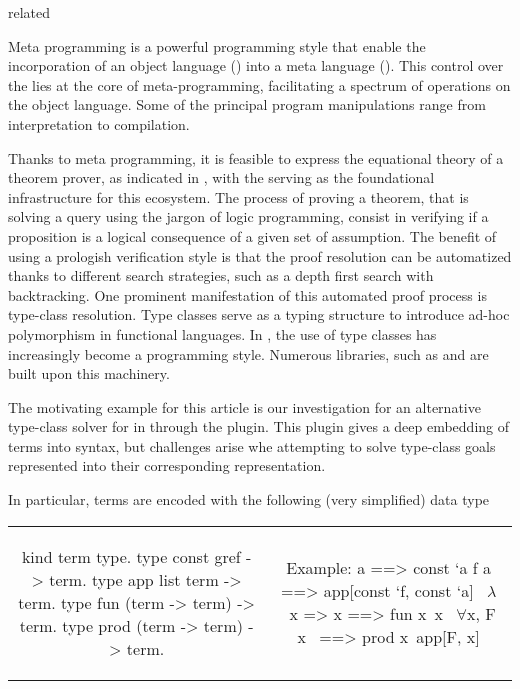 \documentclass{rapport}
\begin{document}
related~\cite{felty93lics}

Meta programming is a powerful programming style that enable the incorporation
of an object language (\ol) into a meta language (\ml). This control over the
\ol lies at the core of meta-programming, facilitating a spectrum of operations
on the object language. Some of the principal program manipulations range
from interpretation to compilation.

Thanks to meta programming, it is feasible to express the equational theory of a
theorem prover, as indicated in \cite{X, Y, Z}, with the \ml serving as the
foundational infrastructure for this ecosystem. The process of proving a theorem, that is
solving a query using the jargon of logic programming, consist in verifying if a
proposition is a logical consequence of a given set of assumption. The benefit
of using a prologish verification style is that the proof resolution can be
automatized thanks to different search strategies, such as a depth first search
with backtracking. One prominent manifestation of this automated proof process is
type-class resolution\cite{wadler89, sozeau08}. Type classes serve as a typing
structure to introduce ad-hoc polymorphism in functional languages.
In \coq, the use of type classes has increasingly become a programming
style. Numerous libraries, such as \stdpp and
\iris are built upon this machinery.

The motivating example for this article is our investigation for an alternative
type-class solver for \coq in \elpi{} through the \coqelpi
plugin. This plugin gives a deep embedding of \coq terms into \elpi syntax, but
challenges arise whe attempting to solve type-class goals represented into their
corresponding \elpi representation.

In particular, \coq terms are encoded with the following (very simplified)
data type


\noindent %
\begin{tabular}{c|c}
  \begin{minipage}[c]{0.50\linewidth}
    \begin{elpicode}
      kind term type.
      type const gref -> term.
      type app list term -> term.
      type fun (term -> term) -> term.
      type prod (term -> term) -> term.
    \end{elpicode}
  \end{minipage}
  &
  \begin{minipage}[c]{0.48\linewidth}
    \begin{textcode}
      Example:
      a       ==> const `a
      f a     ==> app[const `f, const `a]
      ~$\lambda$~x => x ==> fun x\ x
      ~$\forall$x, F x~ ==> prod x\ app[F, x]
    \end{textcode}
  \end{minipage}
\end{tabular}
\end{document}
